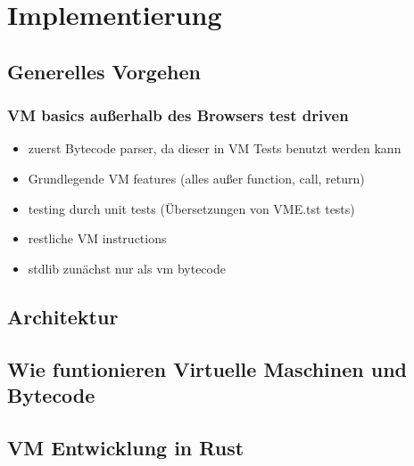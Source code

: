 \section{Implementierung}

\subsection{Generelles Vorgehen}
\subsubsection{VM basics außerhalb des Browsers test driven}
\begin{itemize}
  \item zuerst Bytecode parser, da dieser in VM Tests benutzt werden kann
  \item Grundlegende VM features (alles außer function, call, return)
  \item testing durch unit tests (Übersetzungen von VME.tst tests)
  \item restliche VM instructions
  \item stdlib zunächst nur als vm bytecode
\end{itemize}

\subsection{Architektur}
\subsection{Wie funtionieren Virtuelle Maschinen und Bytecode}
\subsection{VM Entwicklung in Rust}
